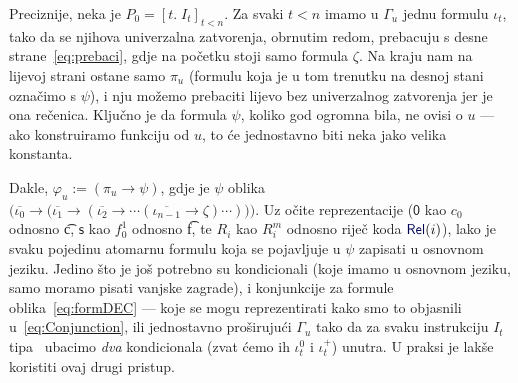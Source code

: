Preciznije, neka je $P_0=[t.\;I_t]_{t<n}$. Za svaki $t<n$ imamo u $\Gamma_u$ jednu formulu $\iota_t$, tako da se njihova univerzalna zatvorenja, obrnutim redom, prebacuju s desne strane~\eqref{eq:prebaci}, gdje na početku stoji samo formula $\zeta$. Na kraju nam na lijevoj strani ostane samo $\pi_u$ (formulu koja je u tom trenutku na desnoj stani označimo s $\psi$), i nju možemo prebaciti lijevo bez univerzalnog zatvorenja jer je ona rečenica. Ključno je da formula $\psi$, koliko god ogromna bila, ne ovisi o $u$ --- ako konstruiramo funkciju od $u$, to će jednostavno biti neka jako velika konstanta.

    Dakle, $\varphi_u:=(\pi_u\to\psi)$, gdje je $\psi$ oblika $\bigl(\overline{\iota_0}\to\bigl(\overline{\iota_1}\to(\overline{\iota_2}\to\dotsb(\overline{\iota_{n-1}}\to\zeta)\dotsb)\bigr)\bigr)$\text.
Uz očite reprezentacije ($\mathsf0$ kao $c_0$ odnosno \t c, $\mathsf s$ kao $f_0^1$ odnosno \t f, te $R_i$ kao $R_i^m$ odnosno riječ koda $\f{Rel}(i)$), lako je svaku pojedinu atomarnu formulu koja se pojavljuje u $\psi$ zapisati u osnovnom jeziku. Jedino što je još potrebno su kondicionali (koje imamo u osnovnom jeziku, samo moramo pisati vanjske zagrade), i konjunkcije za formule oblika~\eqref{eq:formDEC} --- koje se mogu reprezentirati kako smo to objasnili u~\eqref{eq:Conjunction}, ili jednostavno proširujući $\Gamma_u$ tako da za svaku instrukciju $I_t$ tipa \dec\ ubacimo \emph{dva} kondicionala (zvat ćemo ih $\iota_t^0$ i $\iota_t^+$) unutra. U praksi je lakše koristiti ovaj drugi pristup.

